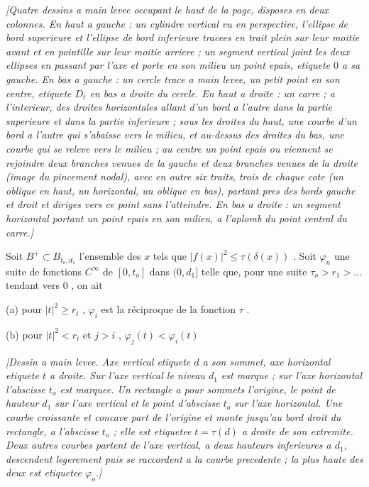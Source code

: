 \begin{center}\emph{[Quatre dessins a main levee occupant le haut de la page, disposes en deux colonnes. En haut a gauche : un cylindre vertical vu en perspective, l'ellipse de bord superieure et l'ellipse de bord inferieure tracees en trait plein sur leur moitie avant et en pointille sur leur moitie arriere ; un segment vertical joint les deux ellipses en passant par l'axe et porte en son milieu un point epais, etiquete $0$ a sa gauche. En bas a gauche : un cercle trace a main levee, un petit point en son centre, etiquete $D_t$ en bas a droite du cercle. En haut a droite : un carre ; a l'interieur, des droites horizontales allant d'un bord a l'autre dans la partie superieure et dans la partie inferieure ; sous les droites du haut, une courbe d'un bord a l'autre qui s'abaisse vers le milieu, et au-dessus des droites du bas, une courbe qui se releve vers le milieu ; au centre un point epais ou viennent se rejoindre deux branches venues de la gauche et deux branches venues de la droite (image du pincement nodal), avec en outre six traits, trois de chaque cote (un oblique en haut, un horizontal, un oblique en bas), partant pres des bords gauche et droit et diriges vers ce point sans l'atteindre. En bas a droite : un segment horizontal portant un point epais en son milieu, a l'aplomb du point central du carre.]}\end{center}

Soit $B^+ \subset B_{t_o,d_1}$ l'ensemble des $x$ tels que $|f(x)|^2 \leq \tau(\delta(x))$ . Soit $\varphi_n$ une suite de fonctions $C^\infty$ de $[0, t_o]$ dans $(0, d_1]$ telle que, pour une suite $\tau_o > r_1 > \ldots$ tendant vers $0$ , on ait

(a) pour $|t|^2 \geq r_i$ , $\varphi_i$ est la réciproque de la fonction $\tau$ .

(b) pour $|t|^2 < r_i$ et $j > i$ , $\varphi_j(t) < \varphi_i(t)$

\begin{center}\emph{[Dessin a main levee. Axe vertical etiquete $d$ a son sommet, axe horizontal etiquete $t$ a droite. Sur l'axe vertical le niveau $d_1$ est marque ; sur l'axe horizontal l'abscisse $t_o$ est marquee. Un rectangle a pour sommets l'origine, le point de hauteur $d_1$ sur l'axe vertical et le point d'abscisse $t_o$ sur l'axe horizontal. Une courbe croissante et concave part de l'origine et monte jusqu'au bord droit du rectangle, a l'abscisse $t_o$ ; elle est etiquetee $t=\tau(d)$ a droite de son extremite. Deux autres courbes partent de l'axe vertical, a deux hauteurs inferieures a $d_1$, descendent legerement puis se raccordent a la courbe precedente ; la plus haute des deux est etiquetee $\varphi_o$.]}\end{center}

